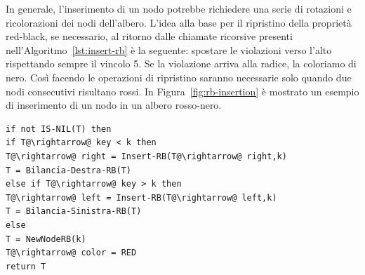In generale, l'inserimento di un nodo potrebbe richiedere una serie di rotazioni e ricolorazioni dei nodi dell'albero. L'idea alla base per il ripristino della proprietà red-black, se necessario, al ritorno dalle chiamate ricorsive presenti nell'Algoritmo~\ref{lst:insert-rb} è la seguente: spostare le violazioni verso l'alto rispettando sempre il vincolo 5. Se la violazione arriva alla radice, la coloriamo di nero. Così facendo le operazioni di ripristino saranno necessarie solo quando due nodi consecutivi risultano rossi. In Figura~\ref{fig:rb-insertion} è mostrato un esempio di inserimento di un nodo in un albero rosso-nero.


\begin{lstlisting}[language=asd,caption={Insert-RB(T,k)},label=lst:insert-rb]
if not IS-NIL(T) then
if T@\rightarrow@ key < k then
T@\rightarrow@ right = Insert-RB(T@\rightarrow@ right,k)
T = Bilancia-Destra-RB(T)
else if T@\rightarrow@ key > k then
T@\rightarrow@ left = Insert-RB(T@\rightarrow@ left,k)
T = Bilancia-Sinistra-RB(T)
else
T = NewNodeRB(k)
T@\rightarrow@ color = RED
return T
\end{lstlisting}

